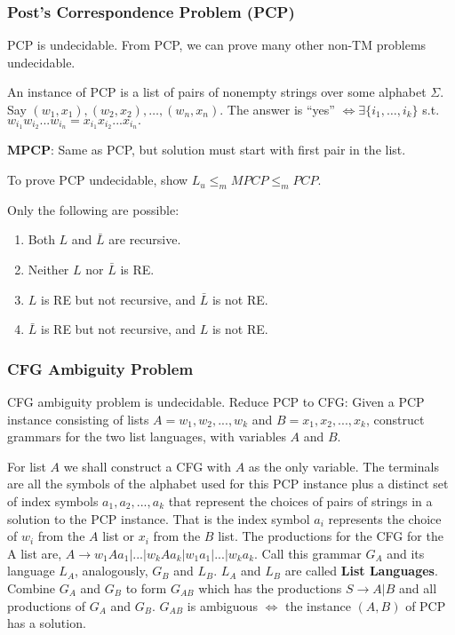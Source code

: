 \subsubsection{Post's Correspondence Problem (PCP)}
PCP is undecidable. From PCP, we can prove many other non-TM problems undecidable.

An instance of PCP is a list of pairs of nonempty strings over some alphabet $\Sigma$.
Say $(w_1, x_1), (w_2, x_2), \hdots, (w_n, x_n).$ The answer is
“yes” $\iff \exists \{i_1,\hdots,i_k\}$ s.t. $w_{i_1}w_{i_2}...w_{i_n} = x_{i_1}x_{i_2}...x_{i_n}.$

\textbf{MPCP}: Same as PCP, but solution must start with first pair in the list.

To prove PCP undecidable, show $L_u \leq_m MPCP \leq_m PCP.$

    Only the following are  possible:
    \begin{enumerate}
        \item Both $L$ and $\bar L$ are recursive.
        \item Neither $L$ nor $\bar L$ is RE.
        \item $L$ is RE but not recursive,  and $\bar L$ is not RE.
        \item $\bar L$ is RE but not recursive, and $L$ is not RE.
    \end{enumerate}
    

\subsubsection{CFG Ambiguity Problem}
CFG ambiguity problem is undecidable. Reduce PCP to CFG: Given a PCP instance consisting of lists $A = w_1, w_2,... ,w_k$ and $B = x_1 , x_2 ,..., x_k$, construct grammars for the two list languages, with variables $A$ and $B$.

For list $A$ we shall construct a CFG with $A$ as the only variable. The terminals are all the symbols of the alphabet used for this PCP instance plus a distinct set of index symbols $a_1,a_2, ..., a_k$ that represent the choices of pairs of strings in a solution to the PCP instance. That is the index symbol $a_i$ represents the choice of $w_i$ from the $A$ list or $x_i$ from the $B$ list. The productions for the CFG for the A list are, 
$A \xrightarrow{} w_1Aa_1 |...|w_kAa_k|w_1a_1|...|w_k a_k$. Call this grammar $G_A$ and its language $L_A$, analogously, $G_B$ and $L_B$. $L_A$ and $L_B$ are called \textbf{List Languages}. Combine $G_A$ and $G_B$ to form $G_{AB}$ which has the productions $S\xrightarrow{}A|B$ and all productions of $G_A$ and $G_B$. $G_{AB}$ is ambiguous $\iff$ the instance $(A,B)$ of PCP has a solution. 

